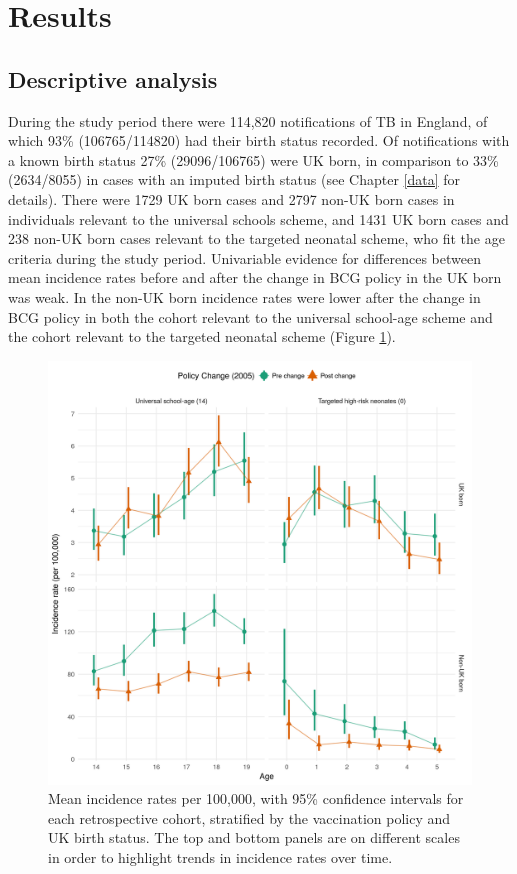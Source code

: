 \documentclass[11pt,twoside]{bristolthesis}
\begin{document}
  \hypertarget{results-2}{%
  \section{Results}\label{results-2}}
  
  \hypertarget{descriptive-analysis}{%
  \subsection{Descriptive analysis}\label{descriptive-analysis}}
  
  During the study period there were 114,820 notifications of TB in England, of which 93\% (106765/114820) had their birth status recorded. Of notifications with a known birth status 27\% (29096/106765) were UK born, in comparison to 33\% (2634/8055) in cases with an imputed birth status (see Chapter \ref{data} for details). There were 1729 UK born cases and 2797 non-UK born cases in individuals relevant to the universal schools scheme, and 1431 UK born cases and 238 non-UK born cases relevant to the targeted neonatal scheme, who fit the age criteria during the study period. Univariable evidence for differences between mean incidence rates before and after the change in BCG policy in the UK born was weak. In the non-UK born incidence rates were lower after the change in BCG policy in both the cohort relevant to the universal school-age scheme and the cohort relevant to the targeted neonatal scheme (Figure \ref{fig:07-cohort-summary-plot}).
  \begin{figure}
  
  {\centering \includegraphics[width=0.8\linewidth,]{chapters/direct-eff-bcg-change/figure-1} 
  
  }
  
  \caption[Mean incidence rates per 100,000, with 95\% confidence intervals for each retrospective cohort, stratified by the vaccination policy and UK birth status.]{Mean incidence rates per 100,000, with 95\% confidence intervals for each retrospective cohort, stratified by the vaccination policy and UK birth status. The top and bottom panels are on different scales in order to highlight trends in incidence rates over time.}\label{fig:07-cohort-summary-plot}
  \end{figure}
\end{document}
